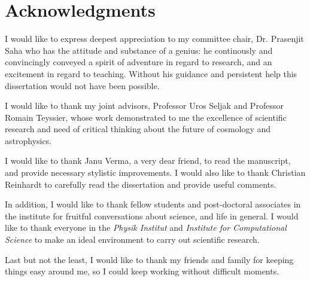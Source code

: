 {}

\chapter*{Acknowledgments}

I would like to express deepest appreciation to my committee chair,
Dr. Prasenjit Saha who has the attitude and substance of a genius: 
he continously and convincingly conveyed a spirit of adventure
in regard to research, and an excitement in regard to teaching. 
Without his guidance and persistent help this dissertation 
would not have been possible. 

I would like to thank my joint advisors, Professor Uros Seljak and
Professor Romain Teyssier, whose work demonstrated to me the 
excellence of scientific research and need of critical thinking
about the future of cosmology and astrophysics.

I would like to thank Janu Verma, a very dear friend, to read 
the manuscript, and provide necessary stylistic improvements. 
I would also like to thank Christian Reinhardt to carefully
read the dissertation and provide useful comments.

In addition, I would like to thank fellow students and post-doctoral
associates in the institute for fruitful conversations about
science, and life in general. I would like to thank everyone
in the {\it Physik Institut} and {\it Institute for Computational Science}
to make an ideal environment to carry out scientific research.

Last but not the least, I would like to thank my friends and
family for keeping things easy around me, so I could 
keep working without difficult moments.



